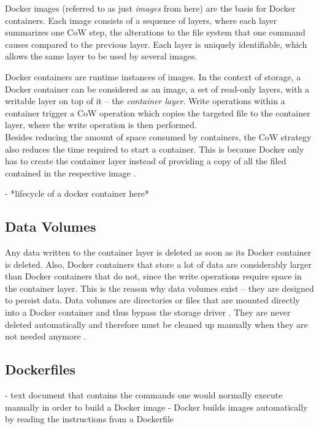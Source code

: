     Docker images (referred to as just \emph{images} from here) are the basis for Docker containers. Each image consists of a sequence of layers, where each layer summarizes one \ac{CoW} step, \ie the alterations to the file system that one command causes compared to the previous layer. Each layer is uniquely identifiable, which allows the same layer to be used by several images.

    Docker containers are runtime instances of images.
    In the context of storage, a Docker container can be considered as an image, \ie a set of read-only layers, with a writable layer on top of it -- the \emph{container layer}. Write operations within a container trigger a \ac{CoW} operation which copies the targeted file to the container layer, where the write operation is then performed. \\
    Besides reducing the amount of space consumed by containers, the \ac{CoW} strategy also reduces the time required to start a container. This is because Docker only has to create the container layer instead of providing a copy of all the filed contained in the respective image \cite{Docker????Dockera}.

    - *lifecycle of a docker container here*

  \subsection{Data Volumes} %
  \label{sub:data_volumes}
    Any data written to the container layer is deleted as soon as its Docker container is deleted.
    Also, Docker containers that store a lot of data are considerably larger than Docker containers that do not, since the write operations require space in the container layer. This is the reason why data volumes exist -- they are designed to persist data. Data volumes are directories or files that are mounted directly into a Docker container and thus bypass the storage driver \cite{Docker????Docker}. They are never deleted automatically and therefore must be cleaned up manually when they are not needed anymore \cite{Docker????Dockera}.


  \subsection{Dockerfiles} %
  \label{sub:dockerfiles}
    - text document that contains the commands one would normally execute manually in order to build a Docker image
    - Docker builds images automatically by reading the instructions from a Dockerfile
    \cite{Docker????Docker}

